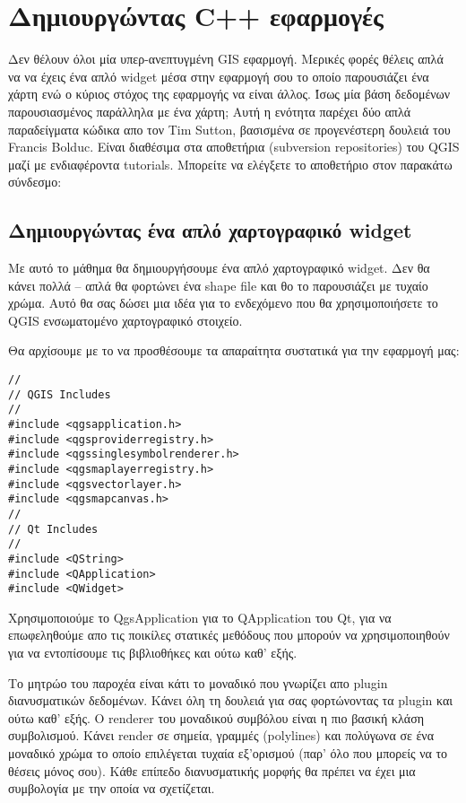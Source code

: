 \section{Δημιουργώντας C++ εφαρμογές}

Δεν θέλουν όλοι μία υπερ-ανεπτυγμένη GIS εφαρμογή. Μερικές φορές θέλεις απλά να να έχεις ένα απλό widget μέσα στην εφαρμογή σου το οποίο παρουσιάζει ένα χάρτη ενώ ο κύριος στόχος της εφαρμογής να είναι άλλος. Ίσως μία βάση δεδομένων παρουσιασμένος παράλληλα με ένα χάρτη;  Αυτή η ενότητα παρέχει δύο απλά παραδείγματα κώδικα απο τον Tim Sutton, βασισμένα σε προγενέστερη δουλειά του Francis Bolduc. Είναι διαθέσιμα στα αποθετήρια (subversion repositories) του QGIS μαζί με ενδιαφέροντα tutorials. Μπορείτε να ελέγξετε το αποθετήριο στον παρακάτω σύνδεσμο: 

\subsection{Δημιουργώντας ένα απλό χαρτογραφικό widget }\label{subsec:simple_widget}

Με αυτό το μάθημα θα δημιουργήσουμε ένα απλό χαρτογραφικό widget. Δεν θα κάνει πολλά – απλά θα φορτώνει ένα shape file και θο το παρουσιάζει με τυχαίο χρώμα. Αυτό θα σας δώσει μια ιδέα για το ενδεχόμενο που θα χρησιμοποιήσετε το QGIS ενσωματομένο χαρτογραφικό στοιχείο.

Θα αρχίσουμε με το να προσθέσουμε τα απαραίτητα συστατικά για την εφαρμογή μας:

\begin{verbatim}
//
// QGIS Includes
//
#include <qgsapplication.h>
#include <qgsproviderregistry.h>
#include <qgssinglesymbolrenderer.h>
#include <qgsmaplayerregistry.h>
#include <qgsvectorlayer.h>
#include <qgsmapcanvas.h>
//
// Qt Includes
//
#include <QString>
#include <QApplication>
#include <QWidget>
\end{verbatim}

Χρησιμοποιούμε το QgsApplication για το QΑpplication του Qt, για να επωφεληθούμε απο τις ποικίλες στατικές μεθόδους που μπορούν να χρησιμοποιηθούν για να εντοπίσουμε τις βιβλιοθήκες και ούτω καθ' εξής. 

Το μητρώο του παροχέα είναι κάτι το μοναδικό που γνωρίζει απο plugin διανυσματικών δεδομένων. Κάνει όλη τη δουλειά για σας φορτώνοντας τα plugin και ούτω καθ' εξής. O renderer του μοναδικού συμβόλου είναι η πιο βασική κλάση συμβολισμού. Κάνει render σε σημεία, γραμμές (polylines) και πολύγωνα σε ένα μοναδικό χρώμα το οποίο επιλέγεται τυχαία εξ'ορισμού (παρ' όλο που μπορείς να το θέσεις μόνος σου). Κάθε επίπεδο διανυσματικής μορφής θα πρέπει να έχει μια συμβολογία με την οποία να σχετίζεται. 

